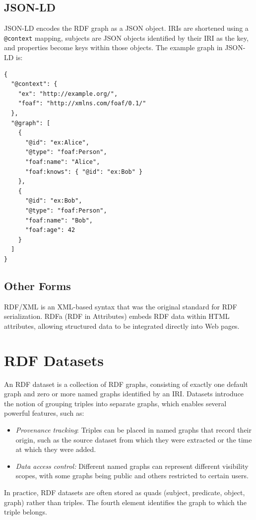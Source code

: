 \subsection{JSON-LD}
JSON-LD encodes the RDF graph as a JSON object. IRIs are shortened using a \texttt{@context} mapping, subjects are JSON objects identified by their IRI as the key, and properties become keys within those objects. The example graph in JSON-LD is:

\begin{lstlisting}[caption=Example graph in JSON-LD]
{
  "@context": {
    "ex": "http://example.org/",
    "foaf": "http://xmlns.com/foaf/0.1/"
  },
  "@graph": [
    {
      "@id": "ex:Alice",
      "@type": "foaf:Person",
      "foaf:name": "Alice",
      "foaf:knows": { "@id": "ex:Bob" }
    },
    {
      "@id": "ex:Bob",
      "@type": "foaf:Person",
      "foaf:name": "Bob",
      "foaf:age": 42
    }
  ]
}
\end{lstlisting}

\subsection{Other Forms}
RDF/XML is an XML-based syntax that was the original standard for RDF serialization. RDFa (RDF in Attributes) embeds RDF data within HTML attributes, allowing structured data to be integrated directly into Web pages.

\section{RDF Datasets}
An RDF dataset is a collection of RDF graphs, consisting of exactly one default graph and zero or more named graphs identified by an IRI. 
Datasets introduce the notion of grouping triples into separate graphs, which enables several powerful features, such as: 

\begin{itemize}
    \item \emph{Provenance tracking}: Triples can be placed in named graphs that record their origin, such as the source dataset from which they were extracted or the time at which they were added. 

    \item \emph{Data access control:} Different named graphs can represent different visibility scopes, with some graphs being public and others restricted to certain users.
\end{itemize}

In practice, RDF datasets are often stored as quads (subject, predicate, object, graph) rather than triples. 
The fourth element identifies the graph to which the triple belongs. 

